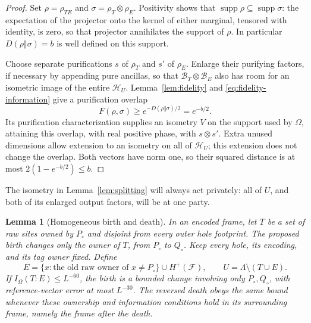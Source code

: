\documentclass[11pt]{article}
\numberwithin{equation}{section}
\newtheorem{lemma}[theorem]{Lemma}
\theoremstyle{definition}
\theoremstyle{remark}
\DeclareMathOperator{\supp}{supp}
\begin{document}
\begin{proof}
Set $\rho=\rho_{TE}$ and $\sigma=\rho_T\otimes\rho_E$.  Positivity shows
that $\supp\rho\subseteq\supp\sigma$: the expectation of the projector
onto the kernel of either marginal, tensored with identity, is zero, so
that projector annihilates the support of $\rho$.  In particular
$D(\rho\Vert\sigma)=b$ is well defined on this support.

Choose separate purifications $s$ of $\rho_T$ and $s'$ of $\rho_E$.  Enlarge
their purifying factors, if necessary by appending pure ancillas, so that
$\mathcal B_T\otimes\mathcal B_E$ also has room for an isometric image of
the entire $\mathcal H_U$.  Lemma~\ref{lem:fidelity} and
\eqref{eq:fidelity-information} give a purification overlap
\[
 F(\rho,\sigma)\ge e^{-D(\rho\Vert\sigma)/2}=e^{-b/2}.
\]
Its purification characterization supplies an isometry $V$ on the support
used by $\Omega$, attaining this overlap, with real positive phase, with
$s\otimes s'$.  Extra unused dimensions allow extension to an isometry on
all of $\mathcal H_U$; this extension does not change the overlap.  Both
vectors have norm one, so their squared distance is at most
$2(1-e^{-b/2})\le b$.
\end{proof}

The isometry in Lemma~\ref{lem:splitting} will always act privately: all of
$U$, and both of its enlarged output factors, will be at one party.

\begin{lemma}[Homogeneous birth and death]\label{lem:birth}
In an encoded frame, let $T$ be a set of raw sites owned by $P_\circ$ and
disjoint from every outer hole footprint.  The proposed birth changes only
the owner of $T$, from $P_\circ$ to $Q_\circ$.  Keep every hole, its encoding,
and its tag owner fixed.  Define
\begin{equation}\label{eq:birth-partition}
 E=\{x:\text{the old raw owner of }x\ne P_\circ\}
        \cup H^+(\mathcal F),\qquad
 U=\Lambda\setminus(T\cup E).
\end{equation}
If $I_\Omega(T:E)\le L^{-60}$, the birth is a bounded change involving
only $P_\circ,Q_\circ$, with reference-vector error at most $L^{-30}$.
The reversed death obeys the same bound whenever these ownership and
information conditions hold in its surrounding frame, namely the frame
\emph{after} the death.
\end{lemma}
\end{document}
